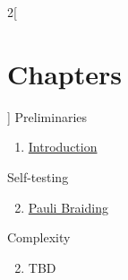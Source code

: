 \begin{multicols}{2}[\section{Chapters}]
\noindent
Preliminaries
\begin{enumerate}
\item \hyperref[section-introduction]{Introduction}
\end{enumerate}
Self-testing
\begin{enumerate}
\setcounter{enumi}{1}
\item \hyperref[section-paulibraiding]{Pauli Braiding}
\end{enumerate}
Complexity
\begin{enumerate}
\setcounter{enumi}{1}
\item TBD
\end{enumerate}
\end{multicols}